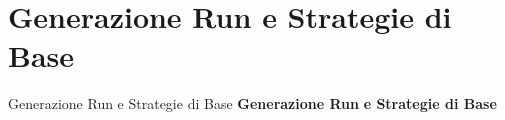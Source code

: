 \section{Generazione Run e Strategie di Base}
\begin{frame}{Generazione Run e Strategie di Base}
	\centering
	\textbf{\Huge{Generazione Run}}
	\vspace{1em}
	\textbf{\Huge{e Strategie di Base}}
\end{frame}


